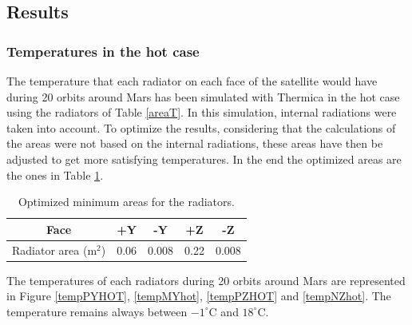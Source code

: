 \documentclass[a4paper, oneside, 11pt]{article}
\begin{document}
\subsection{Results}

\subsubsection{Temperatures in the hot case}

The temperature that each radiator on each face of the satellite would have during 20 orbits around Mars has been simulated with Thermica in the hot case using the radiators of Table \ref{areaT}. In this simulation, internal radiations were taken into account. 
To optimize the results, considering that the calculations of the areas were not based on the internal radiations, these areas have then be adjusted to get more satisfying temperatures. In the end the optimized areas are the ones in Table \ref{areaTOpt}.

\begin{table}[!h]
 \caption{Optimized minimum areas for the radiators.}
 \label{areaTOpt}
\centering \begin{tabular}{| c | c |c |c |c |}
  \hline
Face & +Y &  -Y  & +Z & -Z  \\   
   \hline
 Radiator area ($\text{m}^\text{2}$) & 0.06 & 0.008  & 0.22 &  0.008 \\
     \hline
\end{tabular}
\end{table}

The temperatures of each radiators during 20 orbits around Mars are represented in Figure \ref{tempPYHOT}, \ref{tempMYhot}, \ref{tempPZHOT} and \ref{tempNZhot}. The temperature remains always between $-1^{\circ}$C and $18^{\circ}$C.
\end{document}
